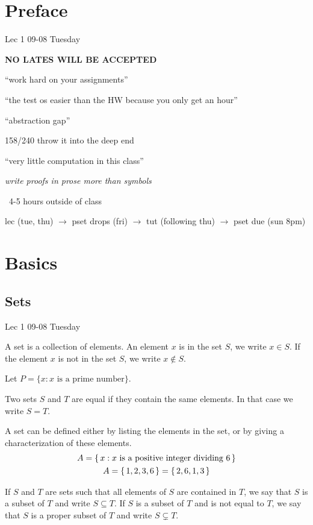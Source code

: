 \documentclass[12pt]{article}
\newcommand{\lecdate}[1]{ %
    \vspace{0in}
    \begin{flushright}
        #1
    \end{flushright}
    \vspace{0in}
}
\begin{document}
\tableofcontents

\section*{Preface}
\lecdate{Lec 1 09-08 Tuesday}
\textbf{NO LATES WILL BE ACCEPTED}

``work hard on your assignments''

``the test os easier than the HW because you only get an hour''

``abstraction gap''

158/240 throw it into the deep end

``very little computation in this class''

\textit{write proofs in prose more than symbols}

~4-5 hours outside of class

lec (tue, thu) $\to$ pset drops (fri) $\to$ tut (following thu) $\to$ pset due (sun 8pm)

\section{Basics}
\subsection{Sets}
\lecdate{Lec 1 09-08 Tuesday}

\begin{defn}
    A set is a collection of elements. An element $x$ is in the set $S$, we write $x \in S$. If the element $x$ is not in the set $S$, we write $x \not\in S$.
\end{defn}

\begin{ex}
    Let $P = \{x : x \text{ is a prime number}\}$.
\end{ex}
\begin{defn}
    Two sets $S$ and $T$ are equal if they contain the same elements. In that case we write $S = T$.
\end{defn}

A set can be defined either by listing the elements in the set, or by giving a characterization of these elements.
\begin{gather*}
    A = \set{x : x \text{ is a positive integer dividing }6} \\
    A = \set{1, 2, 3, 6} = \set{2, 6, 1, 3}
\end{gather*}

\begin{defn}
    If $S$ and $T$ are sets such that all elements of $S$ are contained in $T$, we say that $S$ is a subset of $T$ and write $S \subseteq T$. If $S$ is a subset of $T$ and is not equal to $T$, we say that $S$ is a proper subset of $T$ and write $S \subsetneq T$.
\end{defn}
\end{document}
